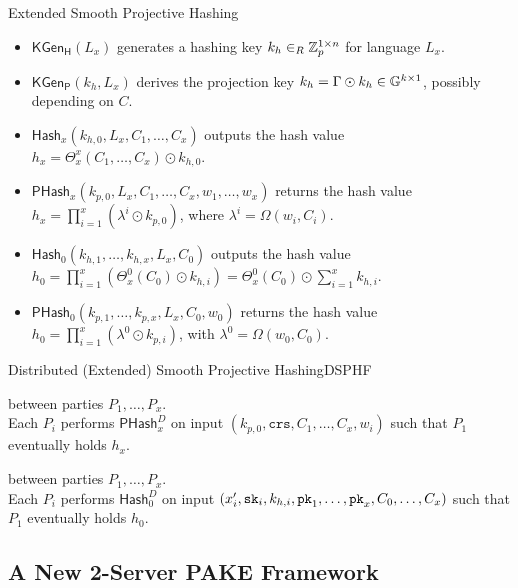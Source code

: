 \documentclass[notes,xcolor=dvipsnames]{beamer}
\begin{document}
\begin{frame}{Extended Smooth Projective Hashing}

\begin{itemize}
	\item $\mathsf{KGen_H}(L_x)$ generates a hashing key $k_h\in_R\mathbb{Z}_p^{1\times n}$ for language $L_x$.
	\item $\mathsf{KGen_P}(k_h,L_x)$ derives the projection key $k_h=\Gamma\odot k_h\in\mathbb{G}^{k\times 1}$, possibly depending on $C$.
	\item $\mathsf{Hash}_x (k_{h,0},L_x,C_1,\dots,C_x)$ outputs the hash value $h_x=\Theta^x_{x}(C_1,\dots,C_x)\odot k_{h,0}$.
	\item $\mathsf{PHash}_x (k_{p,0},L_x,C_1,\dots,C_x,w_1,\dots,w_x)$ returns the hash value $h_x=\prod^{x}_{i=1}(\lambda^i\odot k_{p,0})$, where $\lambda^i=\Omega(w_i,C_i)$.
	\item $\mathsf{Hash}_0(k_{h,1},\dots,k_{h,x},L_x,C_0)$ outputs the hash value $h_0=\prod^{x}_{i=1}(\Theta_{x}^0(C_0)\odot k_{h,i})=\Theta_{x}^0(C_0)\odot \sum^x_{i=1} k_{h,i}$.
	\item $\mathsf{PHash}_0(k_{p,1},\dots,k_{p,x},L_x,C_0,w_0)$ returns the hash value $h_0=\prod^{x}_{i=1}(\lambda^0\odot k_{p,i})$, with $\lambda^0=\Omega(w_0,C_0)$.
\end{itemize}

\end{frame}

\begin{frame}{Distributed (Extended) Smooth Projective Hashing}{DSPHF}

 between parties $P_1,\dots,P_x$.\\
	\hspace*{1em} Each $P_i$ performs $\mathsf{PHash}_x^D$ on input $(k_{p,0},\mathtt{crs},\allowbreak C_1,\dots,C_x,w_i)$ such that $P_1$ eventually holds $h_x$.
	
	\vspace*{2em}
 between parties $P_1,\dots,P_x$.\\
	\hspace*{1em} Each $P_i$ performs $\mathsf{Hash}_0^D$ on input $(x'_i,\mathtt{sk}_i,k_{h,i}, \mathtt{pk}_1,\dots,\mathtt{pk}_x,C_0,\dots,C_x)$ such that $P_1$ eventually holds $h_0$.

\end{frame}

\subsection{A New 2-Server PAKE Framework}
\end{document}
